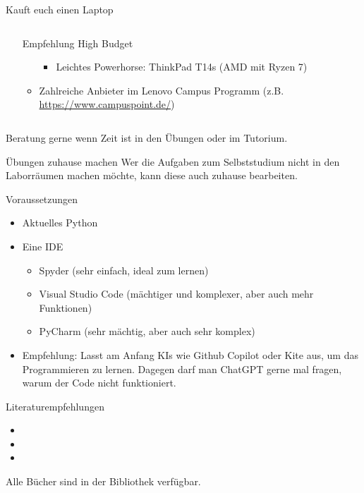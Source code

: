\documentclass[xelatex,aspectratio=168]{beamer}
\begin{document}
\begin{frame}{Kauft euch einen Laptop}
\begin{itemize}
\begin{columns}[T]
\begin{column}{.5\textwidth}
\begin{block}{Empfehlung High Budget}
\begin{itemize}
\begin{itemize}
                          \item Leichtes Powerhorse: ThinkPad T14s (AMD mit Ryzen 7) %
                        \end{itemize}
                  \item Zahlreiche Anbieter im Lenovo Campus Programm (z.B. \url{https://www.campuspoint.de/})
                \end{itemize}
              \end{block}
            \end{column}
          \end{columns}
  \end{itemize}
  Beratung gerne wenn Zeit ist in den Übungen oder im Tutorium.
\end{frame}

\begin{frame}{Übungen zuhause machen}
  Wer die Aufgaben zum Selbststudium nicht in den Laborräumen machen möchte, kann diese auch zuhause bearbeiten.
  \begin{block}{Voraussetzungen}
    \begin{itemize}
      \item Aktuelles Python
      \item Eine IDE
            \begin{itemize}
              \item Spyder (sehr einfach, ideal zum lernen)
              \item Visual Studio Code (mächtiger und komplexer, aber auch mehr Funktionen)
              \item PyCharm (sehr mächtig, aber auch sehr komplex)
            \end{itemize}
      \item Empfehlung: Lasst am Anfang KIs wie Github Copilot oder Kite aus, um das Programmieren zu lernen. Dagegen darf man ChatGPT gerne mal fragen, warum der Code nicht funktioniert.
    \end{itemize}
  \end{block}
\end{frame}

\begin{frame}{Literaturempfehlungen}
  \begin{itemize}
    \item {}
    \item {}
    \item {}
  \end{itemize}
  Alle Bücher sind in der Bibliothek verfügbar.
\end{frame}
\end{document}
